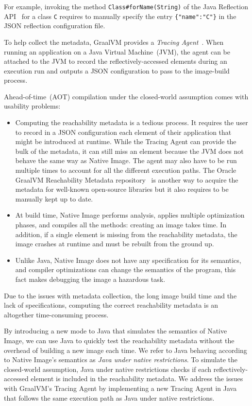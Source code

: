 For example, invoking the method \verb|Class#forName(String)| of the Java Reflection API~\cite{noauthor_core_nodate} for a class \verb|C| requires to manually specify the entry \verb|{"name":"C"}| in the JSON reflection configuration file.

To help collect the metadata, GraalVM provides a \emph{Tracing Agent}~\cite{noauthor_collect_nodate}. When running an application on a Java Virtual Machine~(JVM), the agent can be attached to the JVM to record the reflectively-accessed elements during an execution run and outputs a JSON configuration to pass to the image-build process.

Ahead-of-time~(AOT) compilation under the closed-world assumption comes with usability problems:
\begin{itemize}
    \item Computing the reachability metadata is a tedious process. It requires the user to record in a JSON configuration each element of their application that might be introduced at runtime. While the Tracing Agent can provide the bulk of the metadata, it can still miss an element because the JVM does not behave the same way as Native Image. The agent may also have to be run multiple times to account for all the different execution paths. The Oracle GraalVM Reachability Metadata repository~\cite{noauthor_oraclegraalvm-reachability-metadata_2024} is another way to acquire the metadata for well-known open-source libraries but it also requires to be manually kept up to date.
    \item At build time, Native Image performs analysis, applies multiple optimization phases, and compiles all the methods: creating an image takes time. In addition, if a single element is missing from the reachability metadata, the image crashes at runtime and must be rebuilt from the ground up. 
    \item Unlike Java, Native Image does not have any specification for its semantics, and compiler optimizations can change the semantics of the program, this fact makes debugging the image a hazardous task.
\end{itemize}
Due to the issues with metadata collection, the long image build time and the lack of specifications, computing the correct reachability metadata is an altogether time-consuming process. 

By introducing a new mode to Java that simulates the semantics of Native Image, we can use Java to quickly test the reachability metadata without the overhead of building a new image each time. We refer to Java behaving according to Native Image's semantics as \emph{Java under native restrictions}. To simulate the closed-world assumption, Java under native restrictions checks if each reflectively-accessed element is included in the reachability metadata. We address the issues with GraalVM's Tracing Agent by implementing a new Tracing Agent in Java that follows the same execution path as Java under native restrictions.

